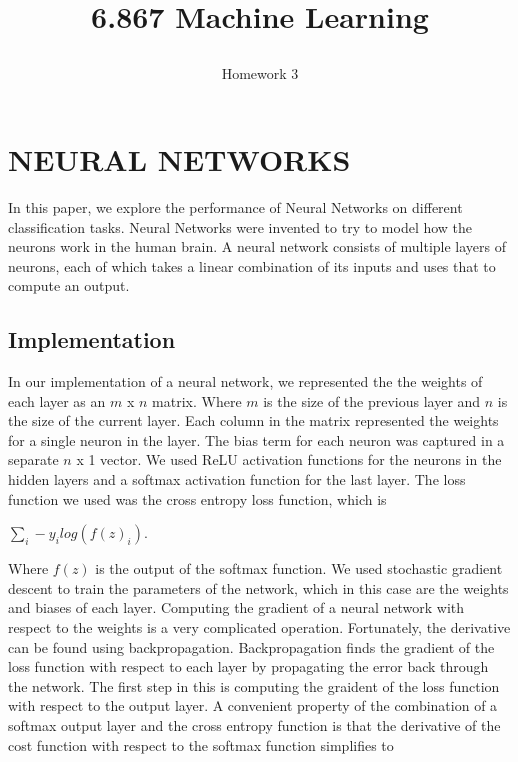 \documentclass[10pt,twoside]{article}
\begin{document}
\title{6.867 Machine Learning  \subtitle{Homework 3} }

\maketitle


\section{\uppercase{Neural Networks}}

\noindent In this paper, we explore the performance of Neural Networks on different classification tasks. Neural Networks were invented to try to model how the neurons work in the human brain. A neural network consists of multiple layers of neurons, each of which takes a linear combination of its inputs and uses that to compute an output. 


\subsection{Implementation}

In our implementation of a neural network, we represented the the weights of each layer as an $m$ x $n$ matrix. Where $m$ is the size of the previous layer and $n$ is the size of the current layer. Each column in the matrix represented the weights for a single neuron in the layer. The bias term for each neuron was captured in a separate $n$ x 1 vector. We used ReLU activation functions for the neurons in the hidden layers and a softmax activation function for the last layer. The loss function we used was the cross entropy loss function, which is 

$\sum _i -y_i log(f(z)_i) $. 

Where $f(z)$ is the output of the softmax function. We used stochastic gradient descent to train the parameters of the network, which in this case are the weights and biases of each layer. Computing the gradient of a neural network with respect to the weights is a very complicated operation. Fortunately, the derivative can be found using backpropagation. Backpropagation finds the gradient of the loss function with respect to each layer by propagating the error back through the network. The first step in this is computing the graident of the loss function with respect to the output layer. A convenient property of the combination of a softmax output layer and the cross entropy function is that the derivative of the cost function with respect to the softmax function simplifies to 
\end{document}
